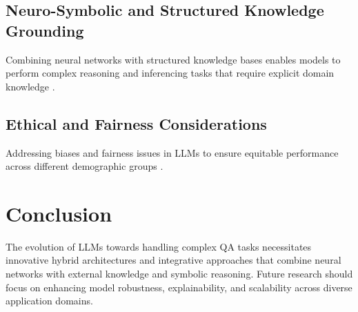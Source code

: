 \documentclass[10pt,a4paper]{article}
\begin{document}
\subsection{Neuro-Symbolic and Structured Knowledge Grounding}
Combining neural networks with structured knowledge bases enables models to perform complex reasoning and inferencing tasks that require explicit domain knowledge \cite{chen2020knowledge}.

\subsection{Ethical and Fairness Considerations}
Addressing biases and fairness issues in LLMs to ensure equitable performance across different demographic groups \cite{bender2021dangers}.

\section{Conclusion}
The evolution of LLMs towards handling complex QA tasks necessitates innovative hybrid architectures and integrative approaches that combine neural networks with external knowledge and symbolic reasoning. Future research should focus on enhancing model robustness, explainability, and scalability across diverse application domains.



\end{document}
